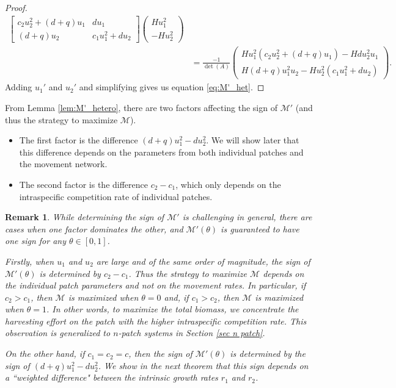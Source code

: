 \documentclass[11pt]{article}
\newtheorem{remark}[theorem]{Remark}
\def\MM{\mathcal{M}}
\theoremstyle{definition}
\begin{document}
\begin{proof}
\begin{align*}
\begin{bmatrix}
    c_2u_2^2+(d+q)u_1 & du_1\\
    (d+q)u_2 & c_1u_1^2+du_2
\end{bmatrix}\begin{pmatrix} Hu_1^2\\-Hu_2^2\end{pmatrix}\nonumber\\
&=\frac{-1}{\det(A)}\begin{pmatrix} Hu_1^2(c_2u_2^2+(d+q)u_1) - Hdu_2^2u_1\\H(d+q)u_1^2u_2-Hu_2^2(c_1u_1^2+du_2)\end{pmatrix}.\label{eqn:u1'u2'_explicit}
\end{align*}
Adding $u_1'$ and $u_2'$ and simplifying gives us equation \eqref{eq:M'_het}.
\end{proof}


From Lemma \ref{lem:M'_hetero}, there are two factors affecting the sign of $\MM'$ (and thus the strategy to maximize $\MM$).
    \begin{itemize}
        \item The first factor is the difference $(d+q)u_1^2-du_2^2$. We will show later that this difference depends on the parameters from both individual patches and the movement network.
        \item The second factor is the difference $c_2-c_1$, which only depends on the intraspecific competition rate of individual patches.
    \end{itemize}

\begin{remark}\normalfont
While determining the sign of $\MM'$ is challenging in general, there are cases when one factor dominates the other, and $\MM'(\theta)$ is guaranteed to have one sign for any $\theta\in[0,1]$.

Firstly, when $u_1$ and $u_2$ are large and of the same order of magnitude, the sign of $\MM'(\theta)$ is determined by $c_2-c_1$. Thus the strategy to maximize $\MM$ depends  on the individual patch parameters and not on the movement rates. In particular, if $c_2>c_1$, then $\MM$ is maximized when $\theta=0$ and, if $c_1>c_2$, then $\MM$ is maximized when $\theta=1$. In other words, to maximize the total biomass, we  concentrate the harvesting effort on the patch with the higher intraspecific competition rate. This observation is generalized to $n$-patch systems in Section \ref{sec n patch}.

On the other hand, if $c_1=c_2=c$, then the sign of $\MM'(\theta)$ is determined by the sign of $(d+q)u_1^2-du_2^2$. We show in the next theorem that this sign depends on a ``weighted difference" between the intrinsic growth rates $r_1$ and $r_2$.
\end{remark}
\end{document}
